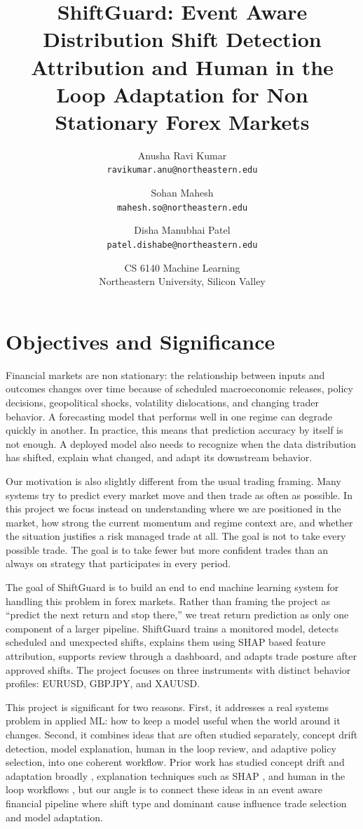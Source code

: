 \documentclass[11pt]{article}
\title{\textbf{ShiftGuard: Event Aware Distribution Shift Detection Attribution and Human in the Loop Adaptation for Non Stationary Forex Markets}}
\author{
Anusha Ravi Kumar \\ \texttt{ravikumar.anu@northeastern.edu}
\and
Sohan Mahesh \\ \texttt{mahesh.so@northeastern.edu}
\and
Disha Manubhai Patel \\ \texttt{patel.dishabe@northeastern.edu}
}
\date{CS 6140 \quad Machine Learning \\ Northeastern University, Silicon Valley}
\begin{document}
\maketitle

\section{Objectives and Significance}
Financial markets are non stationary: the relationship between inputs and outcomes changes over time because of scheduled macroeconomic releases, policy decisions, geopolitical shocks, volatility dislocations, and changing trader behavior. A forecasting model that performs well in one regime can degrade quickly in another. In practice, this means that prediction accuracy by itself is not enough. A deployed model also needs to recognize when the data distribution has shifted, explain what changed, and adapt its downstream behavior.

Our motivation is also slightly different from the usual trading framing. Many systems try to predict every market move and then trade as often as possible. In this project we focus instead on understanding where we are positioned in the market, how strong the current momentum and regime context are, and whether the situation justifies a risk managed trade at all. The goal is not to take every possible trade. The goal is to take fewer but more confident trades than an always on strategy that participates in every period.

The goal of ShiftGuard is to build an end to end machine learning system for handling this problem in forex markets. Rather than framing the project as ``predict the next return and stop there,'' we treat return prediction as only one component of a larger pipeline. ShiftGuard trains a monitored model, detects scheduled and unexpected shifts, explains them using SHAP based feature attribution, supports review through a dashboard, and adapts trade posture after approved shifts. The project focuses on three instruments with distinct behavior profiles: EURUSD, GBPJPY, and XAUUSD.

This project is significant for two reasons. First, it addresses a real systems problem in applied ML: how to keep a model useful when the world around it changes. Second, it combines ideas that are often studied separately, concept drift detection, model explanation, human in the loop review, and adaptive policy selection, into one coherent workflow. Prior work has studied concept drift and adaptation broadly \cite{gama2014survey, lu2019review}, explanation techniques such as SHAP \cite{lundberg2017shap}, and human in the loop workflows \cite{monarch2021hitl, amershi2014power}, but our angle is to connect these ideas in an event aware financial pipeline where shift type and dominant cause influence trade selection and model adaptation.
\end{document}
